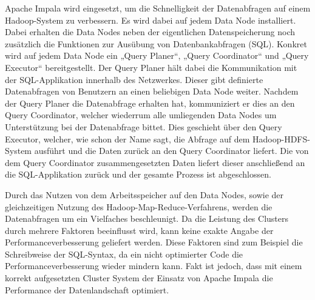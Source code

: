 Apache Impala wird eingesetzt, um die Schnelligkeit der Datenabfragen auf einem
Hadoop-System zu verbessern. Es wird dabei auf jedem Data Node installiert.
Dabei erhalten die Data Nodes neben der eigentlichen Datenspeicherung noch
zusätzlich die Funktionen zur Ausübung von Datenbankabfragen (SQL). Konkret
wird auf jedem Data Node ein „Query Planer“, „Query Coordinator“ und „Query
Executor“ bereitgestellt. Der Query Planer hält dabei die Kommunikation mit der
SQL-Applikation innerhalb des Netzwerkes. Dieser gibt definierte Datenabfragen
von Benutzern an einen beliebigen Data Node weiter. Nachdem der Query Planer
die Datenabfrage erhalten hat, kommuniziert er dies an den Query Coordinator,
welcher wiederrum alle umliegenden Data Nodes um Unterstützung bei der
Datenabfrage bittet. Dies geschieht über den Query Executor, welcher, wie schon
der Name sagt, die Abfrage auf dem Hadoop-HDFS-System ausführt und die Daten
zurück an den Query Coordinator liefert. Die von dem Query Coordinator
zusammengesetzten Daten liefert dieser anschließend an die SQL-Applikation
zurück und der gesamte Prozess ist abgeschlossen.

Durch das Nutzen von dem Arbeitsspeicher auf den Data Nodes, sowie der
gleichzeitigen Nutzung des Hadoop-Map-Reduce-Verfahrens, werden die
Datenabfragen um ein Vielfaches beschleunigt. Da die Leistung des Clusters
durch mehrere Faktoren beeinflusst wird, kann keine exakte Angabe der
Performanceverbesserung geliefert werden. Diese Faktoren sind zum Beispiel die
Schreibweise der SQL-Syntax, da ein nicht optimierter Code die
Performanceverbesserung wieder mindern kann. Fakt ist jedoch, dass mit einem
korrekt aufgesetzten Cluster System der Einsatz von Apache Impala die
Performance der Datenlandschaft optimiert.
\nl%

